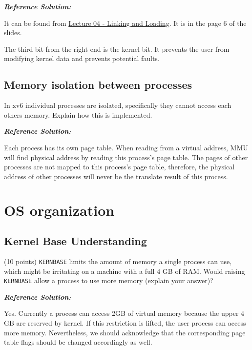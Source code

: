 \documentclass[]{article}
\begin{document}
\textbf{\emph{Reference Solution:}}

It can be found from
\href{https://www.ics.uci.edu/~aburtsev/143A/lectures/lecture04-linking-and-loading/lecture04-linking-and-loading.pdf}{Lecture
04 - Linking and Loading}. It is in the page 6 of the slides.

The third bit from the right end is the kernel bit. It prevents the user
from modifying kernel data and prevents potential faults.

\hypertarget{memory-isolation-between-processes}{%
\subsection{Memory isolation between
processes}\label{memory-isolation-between-processes}}

In xv6 individual processes are isolated, specifically they cannot
access each others memory. Explain how this is implemented.

\textbf{\emph{Reference Solution:}}

Each process has its own page table. When reading from a virtual
address, MMU will find physical address by reading this process's page
table. The pages of other processes are not mapped to this process's
page table, therefore, the physical address of other processes will
never be the translate result of this process.

\hypertarget{os-organization}{%
\section{OS organization}\label{os-organization}}

\hypertarget{kernel-base-understanding}{%
\subsection{Kernel Base Understanding}\label{kernel-base-understanding}}

(10 points) \texttt{KERNBASE} limits the amount of memory a single
process can use, which might be irritating on a machine with a full 4 GB
of RAM. Would raising \texttt{KERNBASE} allow a process to use more
memory (explain your answer)?

\textbf{\emph{Reference Solution:}}

Yes. Currently a process can access 2GB of virtual memory because the
upper 4 GB are reserved by kernel. If this restriction is lifted, the
user process can access more memory. Nevertheless, we should acknowledge
that the corresponding page table flags should be changed accordingly as
well.
\end{document}
